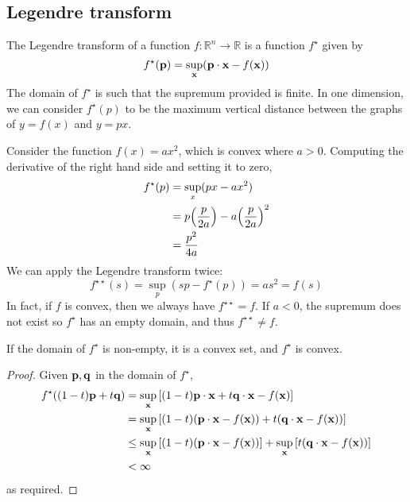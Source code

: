 \subsection{Legendre transform}
\begin{definition}
	The Legendre transform of a function \( f \colon \mathbb R^n \to \mathbb R \) is a function \( f^\star \) given by
	\[
		f^\star(\vb p) = \sup_{\vb x} (\vb p \cdot \vb x - f(\vb x))
	\]
	The domain of \( f^\star \) is such that the supremum provided is finite.
	In one dimension, we can consider \( f^\star(p) \) to be the maximum vertical distance between the graphs of \( y = f(x) \) and \( y = px \).
\end{definition}
\begin{example}
	Consider the function \( f(x) = ax^2 \), which is convex where \( a > 0 \).
	Computing the derivative of the right hand side and setting it to zero,
	\begin{align*}
		f^\star(p) & = \sup_x (px - ax^2)                           \\
		           & = p\qty(\frac{p}{2a}) - a \qty(\frac{p}{2a})^2 \\
		           & = \frac{p^2}{4a}
	\end{align*}
	We can apply the Legendre transform twice:
	\[
		f^{\star\star}(s) = \sup_p (sp - f^\star(p)) = as^2 = f(s)
	\]
	In fact, if \( f \) is convex, then we always have \( f^{\star\star} = f \).
	If \( a < 0 \), the supremum does not exist so \( f^\star \) has an empty domain, and thus \( f^{\star\star} \neq f \).
\end{example}
\begin{proposition}
	If the domain of \( f^\star \) is non-empty, it is a convex set, and \( f^\star \) is convex.
\end{proposition}
\begin{proof}
	Given \( \vb p, \vb q \) in the domain of \( f^\star \),
	\begin{align*}
		f^\star((1-t)\vb p + t \vb q) & = \sup_{\vb x} \qty[(1-t)\vb p \cdot \vb x + t \vb q \cdot \vb x - f(\vb x)]                                      \\
		                              & = \sup_{\vb x} \qty[(1-t)(\vb p \cdot \vb x - f(\vb x)) + t (\vb q \cdot \vb x - f(\vb x))]                       \\
		                              & \leq \sup_{\vb x} \qty[(1-t)(\vb p \cdot \vb x - f(\vb x))] + \sup_{\vb x} \qty[t (\vb q \cdot \vb x - f(\vb x))] \\
		                              & < \infty
	\end{align*}
	as required.
\end{proof}

